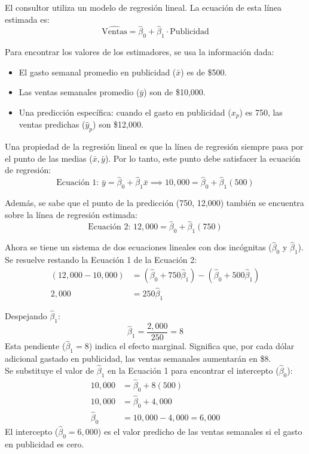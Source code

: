 \documentclass[12pt]{article}
\begin{document}
El consultor utiliza un modelo de regresión lineal. La ecuación de esta línea estimada es:
$$
\hat{\text{Ventas}} = \hat{\beta}_0 + \hat{\beta}_1 \cdot \text{Publicidad}
$$

Para encontrar los valores de los estimadores, se usa la información dada:
\begin{itemize}
    \item El gasto semanal promedio en publicidad ($\bar{x}$) es de \$500.
    \item Las ventas semanales promedio ($\bar{y}$) son de \$10,000.
    \item Una predicción específica: cuando el gasto en publicidad ($x_p$) es 750, las ventas predichas ($\hat{y}_p$) son \$12,000.
\end{itemize}

Una propiedad de la regresión lineal es que la línea de regresión siempre pasa por el punto de las medias ($\bar{x}, \bar{y}$). Por lo tanto, este punto debe satisfacer la ecuación de regresión:
\begin{equation*}
\text{Ecuación 1: } \bar{y} = \hat{\beta}_0 + \hat{\beta}_1 \bar{x} \implies 10,000 = \hat{\beta}_0 + \hat{\beta}_1(500)
\end{equation*}

Además, se sabe que el punto de la predicción (750, 12,000) también se encuentra sobre la línea de regresión estimada:
\begin{equation*}
\text{Ecuación 2: } 12,000 = \hat{\beta}_0 + \hat{\beta}_1(750)
\end{equation*}

Ahora se tiene un sistema de dos ecuaciones lineales con dos incógnitas ($\hat{\beta}_0$ y $\hat{\beta}_1$). Se resuelve restando la Ecuación 1 de la Ecuación 2:
\begin{align*}
(12,000 - 10,000) &= (\hat{\beta}_0 + 750\hat{\beta}_1) - (\hat{\beta}_0 + 500\hat{\beta}_1) \\
2,000 &= 250\hat{\beta}_1
\end{align*}

Despejando $\hat{\beta}_1$:
$$
\hat{\beta}_1 = \frac{2,000}{250} = 8
$$
Esta pendiente ($\hat{\beta}_1 = 8$) indica el efecto marginal. Significa que, por cada dólar adicional gastado en publicidad, las ventas semanales aumentarán en \$8.\\

Se substituye el valor de $\hat{\beta}_1$ en la Ecuación 1 para encontrar el intercepto ($\hat{\beta}_0$):
\begin{align*}
10,000 &= \hat{\beta}_0 + 8(500) \\
10,000 &= \hat{\beta}_0 + 4,000 \\
\hat{\beta}_0 &= 10,000 - 4,000 = 6,000
\end{align*}
El intercepto ($\hat{\beta}_0 = 6,000$) es el valor predicho de las ventas semanales si el gasto en publicidad es cero.\\
\end{document}
